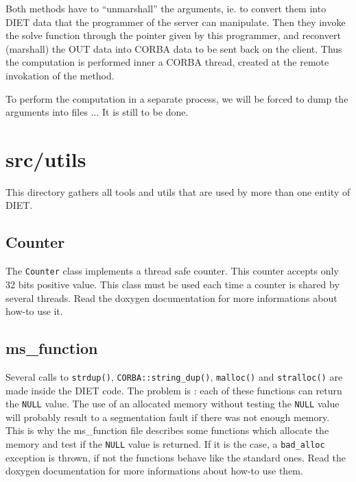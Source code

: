   Both methods have to ``unmarshall'' the arguments, ie. to convert them into DIET
  data that the programmer of the server can manipulate. Then they invoke the
  solve function through the pointer given by this programmer, and reconvert
  (marshall) the OUT data into CORBA data to be sent back on the client. Thus the
  computation is performed inner a CORBA thread, created at the remote invokation
  of the method.

  To perform the computation in a separate process, we will be forced to dump the
  arguments into files ... It is still to be done.


  \section{\textsf{src/utils}}
  \label{s:utils}

  This directory gathers all tools and utils that are used by more than one
  entity of DIET.


  \subsection{\textsf{Counter}}

  The \texttt{Counter} class implements a thread safe counter. This counter
  accepts only 32 bits positive value. This class must be used each time a
  counter is shared by several threads. Read the doxygen documentation for more
  informations about how-to use it.

  \subsection{\textsf{ms\_function}}

  Several calls to \texttt{strdup()}, \texttt{CORBA::string\_dup()},
  \texttt{malloc()} and \texttt{stralloc()} are made inside the DIET code. The
  problem is : each of these functions can return the \texttt{NULL} value. The
  use of an allocated memory without testing the \texttt{NULL} value will
  probably result to a segmentation fault if there was not enough memory. This
  is why the \textsf{ms\_function} file describes some functions which allocate
  the memory and test if the \texttt{NULL} value is returned. If it is the case,
  a \texttt{bad\_alloc} exception is thrown, if not the functions behave like the
  standard ones. Read the doxygen documentation for more informations about
  how-to use them.

